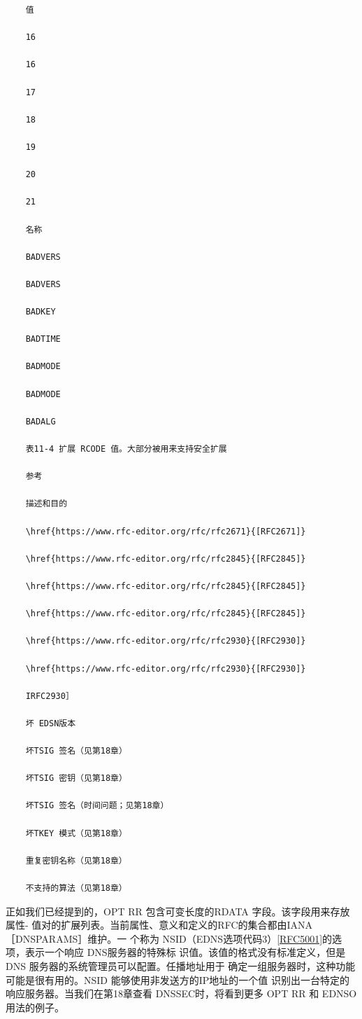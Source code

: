\begin{verbatim}
    值
    
    16
    
    16
    
    17
    
    18
    
    19
    
    20
    
    21
    
    名称
    
    BADVERS
    
    BADVERS
    
    BADKEY
    
    BADTIME
    
    BADMODE
    
    BADMODE
    
    BADALG
    
    表11-4 扩展 RCODE 值。大部分被用来支持安全扩展
    
    参考
    
    描述和目的
    
    \href{https://www.rfc-editor.org/rfc/rfc2671}{[RFC2671]}
    
    \href{https://www.rfc-editor.org/rfc/rfc2845}{[RFC2845]}
    
    \href{https://www.rfc-editor.org/rfc/rfc2845}{[RFC2845]}
    
    \href{https://www.rfc-editor.org/rfc/rfc2845}{[RFC2845]}
    
    \href{https://www.rfc-editor.org/rfc/rfc2930}{[RFC2930]}
    
    \href{https://www.rfc-editor.org/rfc/rfc2930}{[RFC2930]}
    
    IRFC2930］
    
    坏 EDSN版本
    
    坏TSIG 签名（见第18章）
    
    坏TSIG 密钥（见第18章）
    
    坏TSIG 签名（时间问题；见第18章）
    
    坏TKEY 模式（见第18章）
    
    重复密钥名称（见第18章）
    
    不支持的算法（见第18章）
\end{verbatim}

正如我们已经提到的，OPT RR 包含可变长度的RDATA 字段。该字段用来存放属性-
值对的扩展列表。当前属性、意义和定义的RFC的集合都由IANA［DNSPARAMS］维护。一
个称为 NSID（EDNS选项代码3）\href{https://www.rfc-editor.org/rfc/rfc5001}{[RFC5001]}的选项，表示一个响应 DNS服务器的特殊标
识值。该值的格式没有标准定义，但是DNS 服务器的系统管理员可以配置。任播地址用于
确定一组服务器时，这种功能可能是很有用的。NSID 能够使用非发送方的IP地址的一个值
识别出一台特定的响应服务器。当我们在第18章查看 DNSSEC时，将看到更多 OPT RR 和
EDNSO用法的例子。

